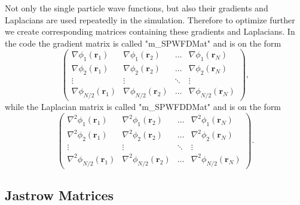 \documentclass[../main.tex]{subfiles}
\begin{document}
Not only the single particle wave functions, but also their gradients and Laplacians are used repeatedly in the simulation. Therefore to optimize further we create corresponding matrices containing these gradients and Laplacians. In the code the gradient matrix is called "m\_SPWFDMat" and is on the form
\begin{equation}
    \left( \begin{array}{cccc} \nabla\phi_1(\mathbf{r}_1) & \nabla\phi_1(\mathbf{r}_2) & \dots & \nabla\phi_1(\mathbf{r}_N)\\
                                \nabla\phi_2(\mathbf{r}_1) & \nabla\phi_2(\mathbf{r}_2) & \dots & \nabla\phi_2(\mathbf{r}_N)\\
                                \vdots & \vdots & \ddots & \vdots\\
                                \nabla\phi_{N/2}(\mathbf{r}_1) & \nabla\phi_{N/2}(\mathbf{r}_2) & \dots & \nabla\phi_{N/2}(\mathbf{r}_N)

             \end{array} \right),
\end{equation}
while the Laplacian matrix is called "m\_SPWFDDMat" and is on the form
\begin{equation}
    \left( \begin{array}{cccc} \nabla^2\phi_1(\mathbf{r}_1) & \nabla^2\phi_1(\mathbf{r}_2) & \dots & \nabla^2\phi_1(\mathbf{r}_N)\\
                                \nabla^2\phi_2(\mathbf{r}_1) & \nabla^2\phi_2(\mathbf{r}_2) & \dots & \nabla^2\phi_2(\mathbf{r}_N)\\
                                \vdots & \vdots & \ddots & \vdots\\
                                \nabla^2\phi_{N/2}(\mathbf{r}_1) & \nabla^2\phi_{N/2}(\mathbf{r}_2) & \dots & \nabla^2\phi_{N/2}(\mathbf{r}_N)

             \end{array} \right).
\end{equation}

\subsection{Jastrow Matrices}
\end{document}
